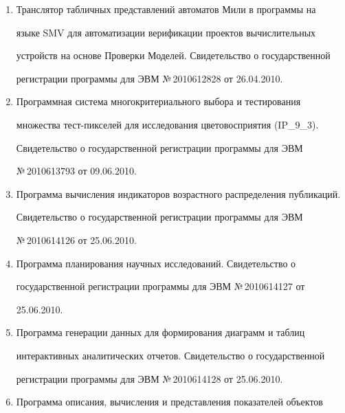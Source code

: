 \begin{enumerate}[1.]
регистрации базы данных №\,2010620223 от 12.03.2010.


\item {}


Транслятор табличных представлений автоматов Мили в программы на 


языке SMV для автоматизации верификации проектов вычислительных 


устройств на основе Проверки Моделей. Свидетельство о государственной 


регистрации программы для ЭВМ №\,2010612828 от 26.04.2010.


\item {}


Программная сис\-те\-ма многокритериального выбора и тестирования 


множества тест-пикселей для исследования цветовосприятия (IP\_9\_3). 


Свидетельство о государственной регистрации программы для ЭВМ 


№\,2010613793 от 09.06.2010.


\item {}


Программа вычисления индикаторов возрастного распределения публикаций. 


Свидетельство о государственной регистрации программы для ЭВМ 


№\,2010614126 от 25.06.2010.


\item {}


Программа планирования научных исследований. Свидетельство о 


государственной регистрации программы для ЭВМ №\,2010614127 от 


25.06.2010.


\item {}


Программа генерации данных для формирования диаграмм и таблиц 


интерактивных аналитических отчетов. Свидетельство о государственной 


регистрации программы для ЭВМ №\,2010614128 от 25.06.2010.


\item {}


Программа описания, вычисления и представления показателей объектов 



\end{enumerate}
